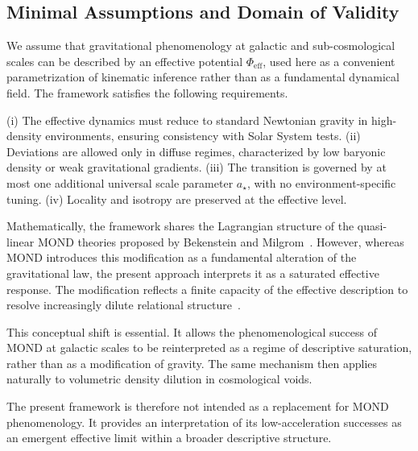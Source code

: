 \subsection{Minimal Assumptions and Domain of Validity}
  \label{subsec:minimal_assumptions}

  We assume that gravitational phenomenology at galactic and sub-cosmological
  scales can be described by an effective potential $\Phi_{\mathrm{eff}}$,
  used here as a convenient parametrization of kinematic inference rather than
  as a fundamental dynamical field.
  The framework satisfies the following requirements.

  (i) The effective dynamics must reduce to standard Newtonian gravity in
  high-density environments,
  ensuring consistency with Solar System tests.
  (ii) Deviations are allowed only in diffuse regimes,
  characterized by low baryonic density or weak gravitational gradients.
  (iii) The transition is governed by at most one additional universal scale
  parameter $a_\star$,
  with no environment-specific tuning.
  (iv) Locality and isotropy are preserved at the effective level.

  Mathematically, the framework shares the Lagrangian structure of the
  quasi-linear MOND theories proposed by Bekenstein and Milgrom~\cite{Bekenstein1984}.
  However, whereas MOND introduces this modification as a fundamental alteration
  of the gravitational law,
  the present approach interprets it as a saturated effective response.
  The modification reflects a finite capacity of the effective description
  to resolve increasingly dilute relational structure~\cite{Beau2026b}.

  This conceptual shift is essential.
  It allows the phenomenological success of MOND at galactic scales to be
  reinterpreted as a regime of descriptive saturation,
  rather than as a modification of gravity.
  The same mechanism then applies naturally to volumetric density dilution
  in cosmological voids.

  The present framework is therefore not intended as a replacement for MOND
  phenomenology.
  It provides an interpretation of its low-acceleration successes
  as an emergent effective limit within a broader descriptive structure.

